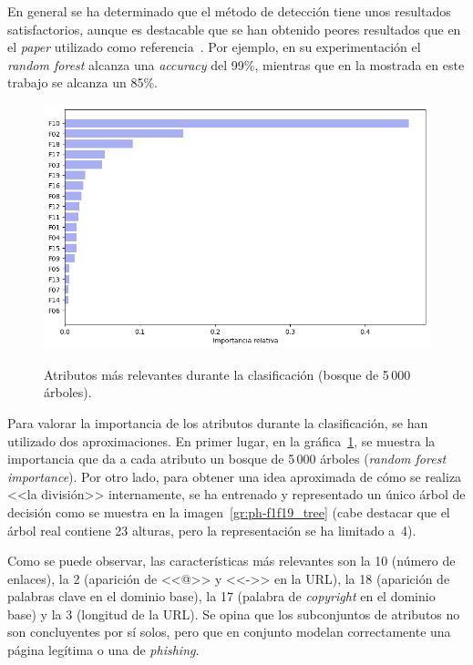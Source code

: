 En general se ha determinado que el método de detección tiene unos resultados satisfactorios, aunque es destacable que se han obtenido peores resultados que en el \textit{paper} utilizado como referencia~\cite{featuresPhishing2018Gupta}. Por ejemplo, en su experimentación el \textit{random forest} alcanza una \textit{accuracy} del 99\%, mientras que en la mostrada en este trabajo se alcanza un 85\%.

\begin{figure}[h]
	\caption[\textit{Phishing}: detección (\texttt{f1-f19}, atributos relevantes RFI)]{Atributos más relevantes durante la clasificación (bosque de 5\,000 árboles).}
	\centering
	\includegraphics[scale=0.55]{../img/memoria/5_phishing/f1f19_rfi}
	\label{gr:ph-f1f19_rfi}
\end{figure}

Para valorar la importancia de los atributos durante la clasificación, se han utilizado dos aproximaciones. En primer lugar, en la gráfica~\ref{gr:ph-f1f19_rfi}, se muestra la importancia que da a cada atributo un bosque de 5\,000 árboles (\textit{random forest importance}). Por otro lado, para obtener una idea aproximada de cómo se realiza <<la división>> internamente, se ha entrenado y representado un único árbol de decisión como se muestra en la imagen~\ref{gr:ph-f1f19_tree} (cabe destacar que el árbol real contiene 23 alturas, pero la representación se ha limitado a~4).

Como se puede observar, las características más relevantes son la 10 (número de enlaces), la 2 (aparición de <<@>> y <<->> en la URL), la 18 (aparición de palabras clave en el dominio base), la 17 (palabra de \textit{copyright} en el dominio base) y la 3 (longitud de la URL). Se opina que los subconjuntos de atributos no son concluyentes por sí solos, pero que en conjunto modelan correctamente una página legítima o una de \textit{phishing}.

